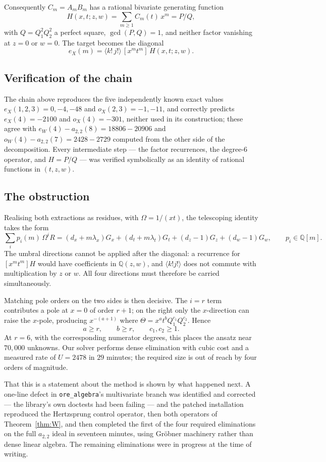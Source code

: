 \documentclass[11pt]{article}
\theoremstyle{definition}
\begin{document}
Consequently $C_m=A_mB_m$ has a rational bivariate generating function
\[
  H(x,t;z,w)=\sum_{m\ge1}C_m(t)\,x^{m}=P/Q,
\]
with $Q=Q_1^{2}Q_2^{2}$ a perfect square, $\gcd(P,Q)=1$, and neither factor
vanishing at $z=0$ or $w=0$. The target becomes the diagonal
\[
  e_X(m)=\langle k!\,j!\rangle\,[x^{m}t^{m}]\,H(x,t;z,w).
\]

\subsection{Verification of the chain}

The chain above reproduces the five independently known exact values
$e_X(1,2,3)=0,-4,-48$ and $o_X(2,3)=-1,-11$, and correctly predicts
$e_X(4)=-2100$ and $o_X(4)=-301$, neither used in its construction; these agree
with $e_W(4)-a_{2,2}(8)=18806-20906$ and $o_W(4)-a_{2,2}(7)=2428-2729$
computed from the other side of the decomposition. Every intermediate step ---
the factor recurrences, the degree-$6$ operator, and $H=P/Q$ --- was verified
symbolically as an identity of rational functions in $(t,z,w)$.

\subsection{The obstruction}

Realising both extractions as residues, with $\Omega=1/(xt)$, the telescoping
identity takes the form
\[
  \sum_i p_i(m)\,\Omega^{i}R
  =(d_x+m\lambda_x)G_x+(d_t+m\lambda_t)G_t+(d_z-1)G_z+(d_w-1)G_w,
  \qquad p_i\in\mathbb{Q}[m].
\]
The umbral directions cannot be applied after the diagonal: a recurrence for
$[x^mt^m]H$ would have coefficients in $\mathbb{Q}(z,w)$, and $\langle
k!j!\rangle$ does not commute with multiplication by $z$ or $w$. All four
directions must therefore be carried simultaneously.

Matching pole orders on the two sides is then decisive. The $i=r$ term
contributes a pole at $x=0$ of order $r+1$; on the right only the
$x$-direction can raise the $x$-pole, producing $x^{-(a+1)}$ where
$\Theta=x^{a}t^{b}Q_1^{c_1}Q_2^{c_2}$. Hence
\[
  a\ge r,\qquad b\ge r,\qquad c_1,c_2\ge1 .
\]
At $r=6$, with the corresponding numerator degrees, this places the ansatz near
$70{,}000$ unknowns. Our solver performs dense elimination with cubic cost and
a measured rate of $U=2478$ in $29$ minutes; the required size is out of reach
by four orders of magnitude.

That this is a statement about the method is shown by what happened next. A
one-line defect in \texttt{ore\_algebra}'s multivariate branch was identified
and corrected --- the library's own doctests had been failing --- and the
patched installation reproduced the Hertzsprung control operator, then both
operators of Theorem~\ref{thm:W}, and then completed the first of the four
required eliminations on the full $a_{2,2}$ ideal in seventeen minutes, using
Gröbner machinery rather than dense linear algebra. The remaining eliminations
were in progress at the time of writing.
\end{document}
